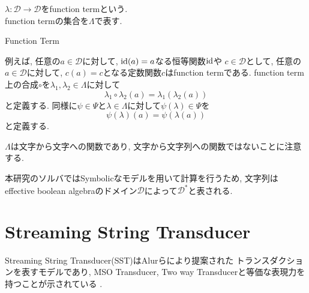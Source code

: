 \documentclass[uplatex,dvipdfmx,a4j]{jsreport}
\begin{document}
  \begin{definition}
    $\lambda: \mathcal{D} \rightarrow \mathcal{D}$をfunction termという. \\
    function termの集合を$\Lambda$で表す.
  \end{definition}Function Term

  例えば, 任意の$a \in \mathcal{D}$に対して, $\mbox{id}(a) = a$なる恒等関数$\mbox{id}$や
  $c \in \mathcal{D}$として,
  任意の$a \in \mathcal{D}$に対して, $c(a) = c$となる定数関数$c$はfunction termである.
  function term上の合成$\circ$を$\lambda_1, \lambda_2 \in \Lambda$に対して
  \[
    \lambda_1 \circ \lambda_2 (a) = \lambda_1(\lambda_2(a))
  \]
  と定義する.
  同様に$\psi \in \Psi$と$\lambda \in \Lambda$に対して$\psi(\lambda) \in \Psi$を
  \[
    \psi(\lambda)(a) = \psi(\lambda(a))
  \]
  と定義する.

  $\Lambda$は文字から文字への関数であり, 文字から文字列への関数ではないことに注意する.

  本研究のソルバではSymbolicなモデルを用いて計算を行うため,
  文字列はeffective boolean algebraのドメイン$\mathcal{D}$によって$\mathcal{D}^*$と表される.

  \section{Streaming String Transducer}

  Streaming String Transducer(SST)\cite{alur2011streaming}はAlurらにより提案された
  トランスダクションを表すモデルであり,
  MSO Transducer, Two way Transducer\cite{engelfriet2001mso}と等価な表現力を持つことが示されている
  \cite{alur_et_al:LIPIcs:2010:2853}.
\end{document}
